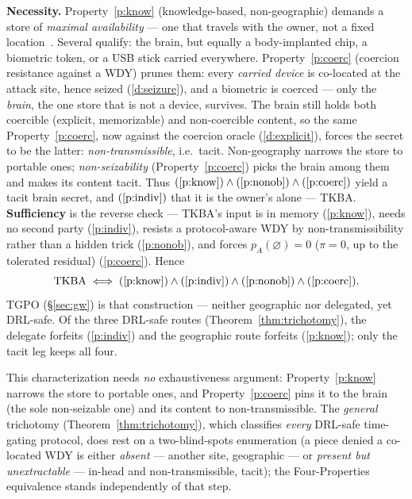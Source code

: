 \begin{corollary}\label{cor:fourprops}
\textbf{Necessity.} Property~\ref{p:know} (knowledge-based, non-geographic) demands a store of
\emph{maximal availability} --- one that travels with the owner, not a fixed
location~\cite{gw-fourprops}. Several qualify: the brain, but equally a
body-implanted chip, a biometric token, or a USB stick carried everywhere.
Property~\ref{p:coerc} (coercion resistance against a WDY) prunes them: every \emph{carried
device} is co-located at the attack site, hence seized (\ref{d:seizure}), and a biometric is
coerced --- only the \emph{brain}, the one store that is not a device, survives.
The brain still holds both coercible (explicit, memorizable) and non-coercible
content, so the same Property~\ref{p:coerc}, now against the coercion oracle (\ref{d:explicit}), forces the
secret to be the latter: \emph{non-transmissible}, i.e.\ tacit. Non-geography
narrows the store to portable ones; \emph{non-seizability} (Property~\ref{p:coerc}) picks the
brain among them and makes its content tacit. Thus $(\ref{p:know})\wedge(\ref{p:nonob})\wedge(\ref{p:coerc})$ yield a
tacit brain secret, and $(\ref{p:indiv})$ that it is the owner's alone --- TKBA. \textbf{Sufficiency} is
the reverse check --- TKBA's input is in memory (\ref{p:know}), needs no second party (\ref{p:indiv}),
resists a protocol-aware WDY by non-transmissibility rather than a hidden trick
(\ref{p:nonob}), and forces $p_A(\varnothing) = 0$ ($\pi = 0$, up to the tolerated residual)
(\ref{p:coerc}). Hence
\[
  \text{TKBA} \;\Longleftrightarrow\; (\ref{p:know})\wedge(\ref{p:indiv})\wedge(\ref{p:nonob})\wedge(\ref{p:coerc}).
\]
TGPO (\S\ref{sec:gw}) is that construction --- neither geographic nor delegated,
yet DRL-safe. Of the three DRL-safe routes (Theorem~\ref{thm:trichotomy}), the
delegate forfeits (\ref{p:indiv}) and the geographic route forfeits (\ref{p:know}); only the tacit leg
keeps all four.
\end{corollary}

\noindent This characterization needs \emph{no} exhaustiveness argument: Property~\ref{p:know}
narrows the store to portable ones, and Property~\ref{p:coerc} pins it to the brain (the sole
non-seizable one) and its content to non-transmissible.
The \emph{general} trichotomy (Theorem~\ref{thm:trichotomy}), which classifies
\emph{every} DRL-safe time-gating protocol, does rest on a two-blind-spots
enumeration (a piece denied a co-located WDY is either \emph{absent} --- another
site, geographic --- or \emph{present but unextractable} --- in-head and
non-transmissible, tacit); the Four-Properties equivalence stands independently of
that step.

